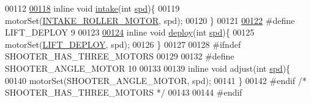 \begin{DoxyCode}
00112 
\hypertarget{motors_8h_source.tex_l00118}{}\hyperlink{motors_8h_ad29bed7d7fa6127b3ecf7e50eab23e9c}{00118} \textcolor{keyword}{inline} \textcolor{keywordtype}{void} \hyperlink{motors_8h_ad29bed7d7fa6127b3ecf7e50eab23e9c}{intake}(\textcolor{keywordtype}{int} \hyperlink{opcontrol_8c_a642ce334330c8b0f6e33dd0a3fa65111}{spd})\{
00119     motorSet(\hyperlink{motors_8h_a8ac783dc4e09804d3b2f7e3b6bbecad7}{INTAKE\_ROLLER\_MOTOR}, spd);
00120 \}
00121 
\hypertarget{motors_8h_source.tex_l00122}{}\hyperlink{motors_8h_a9e703840acb5657339f59982914dffb7}{00122} \textcolor{preprocessor}{#define LIFT\_DEPLOY 9}
00123 
\hypertarget{motors_8h_source.tex_l00124}{}\hyperlink{motors_8h_af9cae4c2a660189553e6c8e51e371913}{00124} \textcolor{keyword}{inline} \textcolor{keywordtype}{void} \hyperlink{motors_8h_af9cae4c2a660189553e6c8e51e371913}{deploy}(\textcolor{keywordtype}{int} \hyperlink{opcontrol_8c_a642ce334330c8b0f6e33dd0a3fa65111}{spd})\{
00125     motorSet(\hyperlink{motors_8h_a9e703840acb5657339f59982914dffb7}{LIFT\_DEPLOY}, spd);
00126 \}
00127 
00128 \textcolor{preprocessor}{#ifndef SHOOTER\_HAS\_THREE\_MOTORS}
00129 
00132 \textcolor{preprocessor}{#define SHOOTER\_ANGLE\_MOTOR 10}
00133 
00139 \textcolor{keyword}{inline} \textcolor{keywordtype}{void} adjust(\textcolor{keywordtype}{int} \hyperlink{opcontrol_8c_a642ce334330c8b0f6e33dd0a3fa65111}{spd})\{
00140     motorSet(SHOOTER\_ANGLE\_MOTOR, spd);
00141 \}
00142 \textcolor{preprocessor}{#endif }\textcolor{comment}{/* SHOOTER\_HAS\_THREE\_MOTORS */}\textcolor{preprocessor}{}
00143 
00144 \textcolor{preprocessor}{#endif}
\end{DoxyCode}
